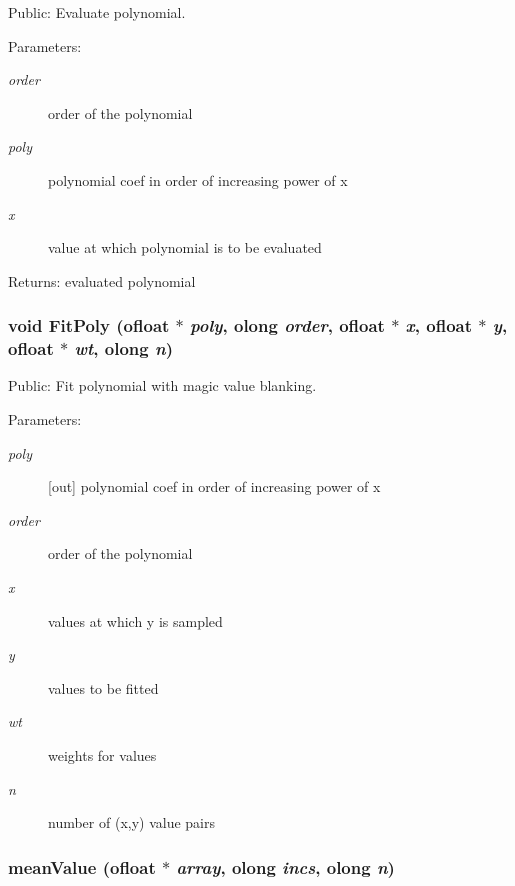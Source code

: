 Public: Evaluate polynomial. 

\begin{Desc}
\item[Parameters:]
\begin{description}
\item[{\em order}]order of the polynomial \item[{\em poly}]polynomial coef in order of increasing power of x \item[{\em x}]value at which polynomial is to be evaluated \end{description}
\end{Desc}
\begin{Desc}
\item[Returns:]evaluated polynomial \end{Desc}
\subsubsection{\setlength{\rightskip}{0pt plus 5cm}void Fit\-Poly ({\bf ofloat} $\ast$ {\em poly}, {\bf olong} {\em order}, {\bf ofloat} $\ast$ {\em x}, {\bf ofloat} $\ast$ {\em y}, {\bf ofloat} $\ast$ {\em wt}, {\bf olong} {\em n})}\label{ObitUtil_8c_a7}


Public: Fit polynomial with magic value blanking. 

\begin{Desc}
\item[Parameters:]
\begin{description}
\item[{\em poly}][out] polynomial coef in order of increasing power of x \item[{\em order}]order of the polynomial \item[{\em x}]values at which y is sampled \item[{\em y}]values to be fitted \item[{\em wt}]weights for values \item[{\em n}]number of (x,y) value pairs \end{description}
\end{Desc}
\subsubsection{ mean\-Value ({\bf ofloat} $\ast$ {\em array}, {\bf olong} {\em incs}, {\bf olong} {\em n})}\label{ObitUtil_8c_a1}


